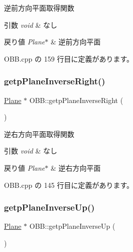 逆前方向平面取得関数 


\begin{DoxyParams}{引数}
{\em void} & なし \\
\hline
\end{DoxyParams}

\begin{DoxyRetVals}{戻り値}
{\em Plane$\ast$} & 逆前方向平面 \\
\hline
\end{DoxyRetVals}


 O\+B\+B.\+cpp の 159 行目に定義があります。

\mbox{\label{class_o_b_b_ae00c6a4fc8db4f51358d38b5c2a65a46}} 
\subsubsection{\texorpdfstring{getp\+Plane\+Inverse\+Right()}{getpPlaneInverseRight()}}
{\footnotesize\ttfamily \mbox{\hyperlink{class_plane}{Plane}} $\ast$ O\+B\+B\+::getp\+Plane\+Inverse\+Right (\begin{DoxyParamCaption}{ }\end{DoxyParamCaption})}



逆右方向平面取得関数 


\begin{DoxyParams}{引数}
{\em void} & なし \\
\hline
\end{DoxyParams}

\begin{DoxyRetVals}{戻り値}
{\em Plane$\ast$} & 逆右方向平面 \\
\hline
\end{DoxyRetVals}


 O\+B\+B.\+cpp の 145 行目に定義があります。

\mbox{\label{class_o_b_b_a77460cf252dfd060d4376451b6f1ad1e}} 
\subsubsection{\texorpdfstring{getp\+Plane\+Inverse\+Up()}{getpPlaneInverseUp()}}
{\footnotesize\ttfamily \mbox{\hyperlink{class_plane}{Plane}} $\ast$ O\+B\+B\+::getp\+Plane\+Inverse\+Up (\begin{DoxyParamCaption}{ }\end{DoxyParamCaption})}




